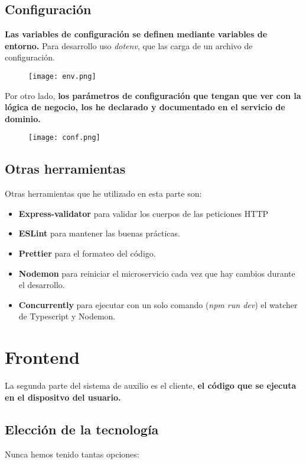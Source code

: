 \subsection{Configuración}\label{sec:config}
\textbf{Las variables de configuración se definen mediante variables de entorno.} Para desarrollo uso \textit{dotenv}, 
que las carga de un archivo de configuración.
\begin{figure}[H]
	\centering	
	\texttt{[image: env.png]}
	\end{figure}

	Por otro lado, \textbf{los parámetros de configuración que tengan que ver con la lógica
	de negocio, los he declarado y documentado en el servicio de dominio.}

\begin{figure}[H]
	\centering	
	\texttt{[image: conf.png]}
	\end{figure}



\subsection{Otras herramientas}\label{sec:tools}
Otras herramientas que he utilizado en esta parte son:
\begin{itemize}
	\item \textbf{Express-validator} para validar los cuerpos de las peticiones HTTP
	\item \textbf{ESLint} para mantener las buenas prácticas.
	\item \textbf{Prettier} para el formateo del código.
	\item \textbf{Nodemon} para reiniciar el microservicio cada vez que hay cambios durante el desarrollo.
	\item \textbf{Concurrently} para ejecutar con un solo comando (\textit{npm run dev}) el watcher de Typescript y Nodemon.
\end{itemize}

\section{Frontend}
La segunda parte del sistema de auxilio es el cliente, \textbf{el código que se ejecuta en el dispositvo del usuario.}
\subsection{Elección de la tecnología}
Nunca hemos tenido tantas opciones:
